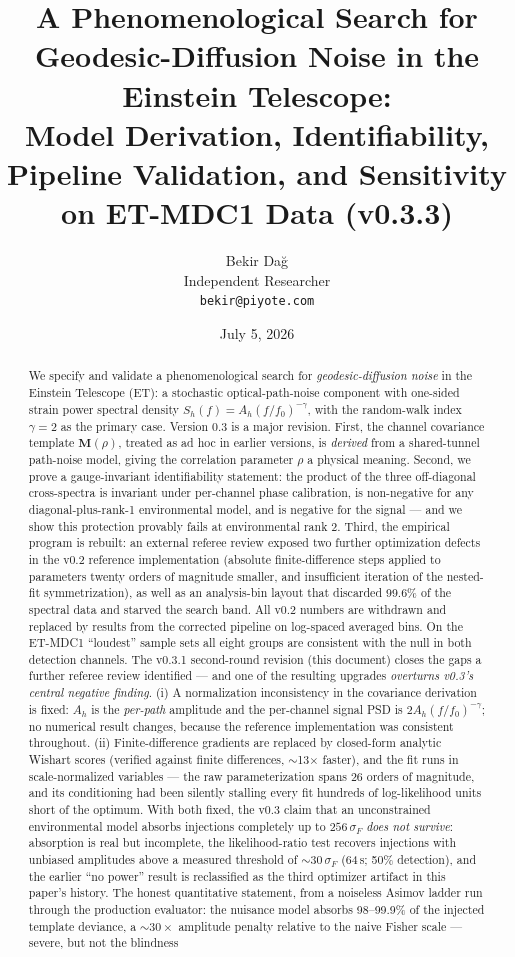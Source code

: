 \documentclass[11pt]{article}
\title{A Phenomenological Search for Geodesic-Diffusion Noise in the Einstein Telescope:\\
\large Model Derivation, Identifiability, Pipeline Validation, and Sensitivity on ET-MDC1 Data (v0.3.3)}
\author{Bekir Da\u{g}\\Independent Researcher\\\texttt{bekir@piyote.com}}
\date{July 5, 2026}
\newcommand{\Ah}{A_h}
\newcommand{\Sh}{S_h}
\begin{document}
\maketitle

\begin{abstract}
We specify and validate a phenomenological search for \emph{geodesic-diffusion noise} in the Einstein Telescope (ET): a stochastic optical-path-noise component with one-sided strain power spectral density $\Sh(f) = \Ah (f/f_0)^{-\gamma}$, with the random-walk index $\gamma = 2$ as the primary case. Version 0.3 is a major revision. First, the channel covariance template $\mathbf{M}(\rho)$, treated as ad hoc in earlier versions, is \emph{derived} from a shared-tunnel path-noise model, giving the correlation parameter $\rho$ a physical meaning. Second, we prove a gauge-invariant identifiability statement: the product of the three off-diagonal cross-spectra is invariant under per-channel phase calibration, is non-negative for any diagonal-plus-rank-1 environmental model, and is negative for the signal --- and we show this protection provably fails at environmental rank 2. Third, the empirical program is rebuilt: an external referee review exposed two further optimization defects in the v0.2 reference implementation (absolute finite-difference steps applied to parameters twenty orders of magnitude smaller, and insufficient iteration of the nested-fit symmetrization), as well as an analysis-bin layout that discarded 99.6\% of the spectral data and starved the search band. All v0.2 numbers are withdrawn and replaced by results from the corrected pipeline on log-spaced averaged bins. On the ET-MDC1 ``loudest'' sample sets all eight groups are consistent with the null in both detection channels. The v0.3.1 second-round revision (this document) closes the gaps a further referee review identified --- and one of the resulting upgrades \emph{overturns v0.3's central negative finding}. (i) A normalization inconsistency in the covariance derivation is fixed: $\Ah$ is the \emph{per-path} amplitude and the per-channel signal PSD is $2\Ah(f/f_0)^{-\gamma}$; no numerical result changes, because the reference implementation was consistent throughout. (ii) Finite-difference gradients are replaced by closed-form analytic Wishart scores (verified against finite differences, $\sim$13$\times$ faster), and the fit runs in scale-normalized variables --- the raw parameterization spans 26 orders of magnitude, and its conditioning had been silently stalling every fit hundreds of log-likelihood units short of the optimum. With both fixed, the v0.3 claim that an unconstrained environmental model absorbs injections completely up to $256\,\sigma_F$ \emph{does not survive}: absorption is real but incomplete, the likelihood-ratio test recovers injections with unbiased amplitudes above a measured threshold of $\sim$$30\,\sigma_F$ (64\,s; 50\% detection), and the earlier ``no power'' result is reclassified as the third optimizer artifact in this paper's history. The honest quantitative statement, from a noiseless Asimov ladder run through the production evaluator: the nuisance model absorbs 98--99.9\% of the injected template deviance, a $\sim$$30\times$ amplitude penalty relative to the naive Fisher scale --- severe, but not the blindness 
\end{abstract}
\end{document}
